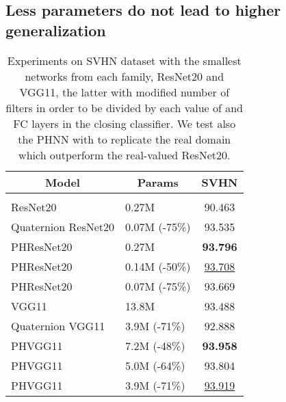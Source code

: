 \documentclass[lettersize,journal]{IEEEtran}
\begin{document}
\subsection{Less parameters do not lead to higher generalization}
\label{ssubsec:imageresults}



\begin{table}[]
\caption{Experiments on SVHN dataset with the smallest networks from each family, ResNet20 and VGG11, the latter with modified number of filters in order to be divided by each value of  and FC layers in the closing classifier. We test also the PHNN with  to replicate the real domain which outperform the real-valued ResNet20.}
\label{tab:img_class_app2}
\begin{center}
\begin{tabular}{llc}
\multicolumn{1}{c}{\bf Model} &\multicolumn{1}{c}{\bf Params} &\multicolumn{1}{c}{\bf SVHN} \\
\hline \\
ResNet20             & 0.27M         & 90.463  \\
Quaternion ResNet20  & 0.07M (-75\%) & 93.535  \\
PHResNet20    & 0.27M & \textbf{93.796}  \\
PHResNet20    & 0.14M (-50\%) & \underline{93.708}  \\
PHResNet20    & 0.07M (-75\%)  & 93.669  \\
\hline
VGG11            & 13.8M        & 93.488  \\
Quaternion VGG11 & 3.9M (-71\%) & 92.888  \\
PHVGG11   & 7.2M (-48\%) & \textbf{93.958}  \\
PHVGG11   & 5.0M (-64\%) & 93.804  \\
PHVGG11   & 3.9M (-71\%) & \underline{93.919}  \\
\end{tabular}
\end{center}
\end{table}
\end{document}
